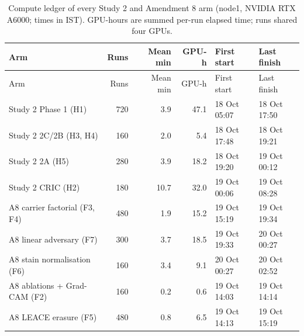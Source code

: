 {\footnotesize
\setlength{\tabcolsep}{3.5pt}
\begin{longtable}{lrrrll}
\caption{Compute ledger of every Study 2 and Amendment 8 arm (node1, NVIDIA RTX A6000; times in IST). GPU-hours are summed per-run elapsed time; runs shared four GPUs.}\label{r:tab:compute}\\
\toprule
Arm & Runs & Mean min & GPU-h & First start & Last finish \\
\midrule
\endfirsthead
\toprule
Arm & Runs & Mean min & GPU-h & First start & Last finish \\
\midrule
\endhead
\bottomrule
\endfoot
Study 2 Phase 1 (H1) & 720 & 3.9 & 47.1 & 18 Oct 05:07 & 18 Oct 17:50 \\
Study 2 2C/2B (H3, H4) & 160 & 2.0 & 5.4 & 18 Oct 17:48 & 18 Oct 19:21 \\
Study 2 2A (H5) & 280 & 3.9 & 18.2 & 18 Oct 19:20 & 19 Oct 00:12 \\
Study 2 CRIC (H2) & 180 & 10.7 & 32.0 & 19 Oct 00:06 & 19 Oct 08:28 \\
A8 carrier factorial (F3, F4) & 480 & 1.9 & 15.2 & 19 Oct 15:19 & 19 Oct 19:34 \\
A8 linear adversary (F7) & 300 & 3.7 & 18.5 & 19 Oct 19:33 & 20 Oct 00:27 \\
A8 stain normalisation (F6) & 160 & 3.4 & 9.1 & 20 Oct 00:27 & 20 Oct 02:52 \\
A8 ablations + Grad-CAM (F2) & 160 & 0.2 & 0.6 & 19 Oct 14:03 & 19 Oct 14:14 \\
A8 LEACE erasure (F5) & 480 & 0.8 & 6.5 & 19 Oct 14:13 & 19 Oct 15:19 \\
\end{longtable}
}
